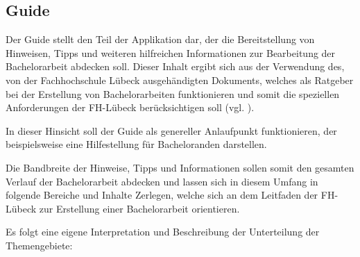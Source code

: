 \documentclass{scrreprt}
\begin{document}
\newpage
\subsection{Guide}
\par Der Guide stellt den Teil der Applikation dar, der die Bereitstellung von Hinweisen, Tipps und weiteren hilfreichen Informationen zur Bearbeitung der Bachelorarbeit abdecken soll. Dieser Inhalt ergibt sich aus der Verwendung des, von der Fachhochschule Lübeck ausgehändigten Dokuments, welches als Ratgeber bei der Erstellung von Bachelorarbeiten funktionieren und somit die speziellen Anforderungen der FH-Lübeck berücksichtigen soll (vgl. \cite[Kapitel 1]{FHLuebeckBAAnleitung}).
\par In dieser Hinsicht soll der Guide als genereller Anlaufpunkt funktionieren, der beispielsweise eine Hilfestellung für Bacheloranden darstellen.\\

\par Die Bandbreite der Hinweise, Tipps und Informationen sollen somit den gesamten Verlauf der Bachelorarbeit abdecken und lassen sich in diesem Umfang in folgende Bereiche und Inhalte Zerlegen, welche sich an dem Leitfaden der FH-Lübeck\cite{FHLuebeckBAAnleitung} zur Erstellung einer Bachelorarbeit orientieren.\\

\par Es folgt eine eigene Interpretation und Beschreibung der Unterteilung der Themengebiete:
\end{document}
